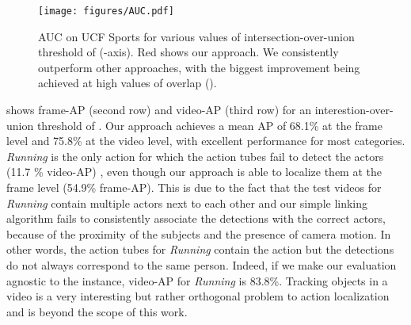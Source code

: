 \documentclass[10pt,twocolumn,letterpaper]{article}
\begin{document}
\begin{figure}[t]
\begin{center}
  \texttt{[image: figures/AUC.pdf]}
\end{center}
   \caption{AUC on UCF Sports for various values of intersection-over-union threshold of  (-axis). Red shows our approach. We consistently outperform other approaches, with the biggest improvement being achieved at high values of overlap ().}
\end{figure}

 shows frame-AP (second row) and video-AP (third row) for an interestion-over-union threshold of . Our approach achieves a mean AP of 68.1\% at the frame level and 75.8\% at the video level, with excellent performance for most categories. \textit{Running} is the only action for which the action tubes fail to detect the actors (11.7 \% video-AP) , even though our approach is able to localize them at the frame level (54.9\% frame-AP).  This is due to the fact that the test videos for \textit{Running} contain multiple actors next to each other and our simple linking algorithm fails to consistently associate the detections with the correct actors, because of the proximity of the subjects and the presence of camera motion. In other words, the action tubes for \textit{Running} contain the action but the detections do not always correspond to the same person. Indeed, if we make our evaluation agnostic to the instance, video-AP for \textit{Running} is 83.8\%. Tracking objects in a video is a very interesting but rather orthogonal problem to action localization and is beyond the scope of this work.

\begin{table}[t!]
\centering
\renewcommand{\arraystretch}{1.2}
\renewcommand{\tabcolsep}{1.2mm}
\vspace{0.1em}
\caption{AP on the UCF Sports dataset for an intersection-over-union threshold of . \textit{frame-AP} measures AP of the action detections at the frame level, while \textit{video-AP} measures AP of the predicted action tubes.}
\vspace{-0.5em}
\end{table}
\end{document}
